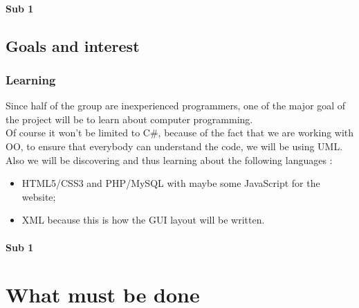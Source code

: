 \documentclass[article]{report}
\begin{document}
									  \subsection{Sub 1}
						\chapter{Goals and interest}
								\section{Learning}
										Since half of the group are inexperienced programmers, one of the major goal of the project will be to learn about computer programming.\\
										
										Of course it won't be limited to C\#, because of the fact that we are working with OO, to ensure that everybody can understand the code, we will be using UML.\newline
										Also we will be discovering and thus learning about the following languages : 
										\begin{itemize}
												\item HTML5/CSS3 and PHP/MySQL with maybe some JavaScript for the website;
												\item XML because this is how the GUI layout will be written.
										\end{itemize}
									  \subsection{Sub 1}
     		\part{What must be done}
     	     		
\end{document}
